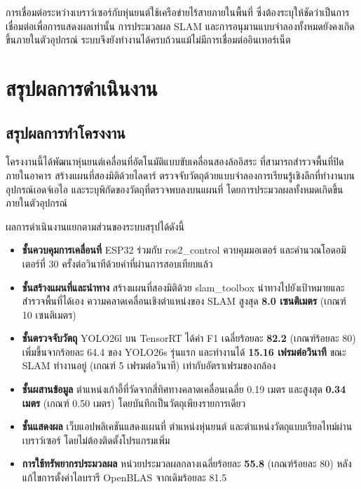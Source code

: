 \documentclass[a4paper,12pt]{report}
\begin{document}
การเชื่อมต่อระหว่างเบราว์เซอร์กับหุ่นยนต์ใช้เครือข่ายไร้สายภายในพื้นที่
ซึ่งต้องระบุให้ชัดว่าเป็นการเชื่อมต่อเพื่อการแสดงผลเท่านั้น
การประมวลผล SLAM และการอนุมานแบบจำลองทั้งหมดยังคงเกิดขึ้นภายในตัวอุปกรณ์
ระบบจึงยังทำงานได้ครบถ้วนแม้ไม่มีการเชื่อมต่ออินเทอร์เน็ต

\chapter{สรุปผลการดำเนินงาน}

\section{สรุปผลการทำโครงงาน}

โครงงานนี้ได้พัฒนาหุ่นยนต์เคลื่อนที่อัตโนมัติแบบขับเคลื่อนสองล้ออิสระ
ที่สามารถสำรวจพื้นที่ปิดภายในอาคาร สร้างแผนที่สองมิติด้วยไลดาร์
ตรวจจับวัตถุด้วยแบบจำลองการเรียนรู้เชิงลึกที่ทำงานบนอุปกรณ์เอดจ์เอไอ
และระบุพิกัดของวัตถุที่ตรวจพบลงบนแผนที่
โดยการประมวลผลทั้งหมดเกิดขึ้นภายในตัวอุปกรณ์

ผลการดำเนินงานแยกตามส่วนของระบบสรุปได้ดังนี้

\begin{itemize}[leftmargin=1.25cm, itemsep=4pt, topsep=6pt]
    \item \textbf{ชั้นควบคุมการเคลื่อนที่} ESP32 ร่วมกับ ros2\_control ควบคุมมอเตอร์
    และคำนวณโอดอมิเตอร์ที่ 30 ครั้งต่อวินาทีด้วยค่าที่ผ่านการสอบเทียบแล้ว

    \item \textbf{ชั้นสร้างแผนที่และนำทาง} สร้างแผนที่สองมิติด้วย slam\_toolbox
    นำทางไปยังเป้าหมายและสำรวจพื้นที่ได้เอง
    ความคลาดเคลื่อนเชิงตำแหน่งของ SLAM สูงสุด \textbf{8.0 เซนติเมตร} (เกณฑ์ 10 เซนติเมตร)

    \item \textbf{ชั้นตรวจจับวัตถุ} YOLO26l บน TensorRT ได้ค่า F1 เฉลี่ยร้อยละ \textbf{82.2} (เกณฑ์ร้อยละ 80)
    เพิ่มขึ้นจากร้อยละ 64.4 ของ YOLO26s รุ่นแรก
    และทำงานได้ \textbf{15.16 เฟรมต่อวินาที} ขณะ SLAM ทำงานอยู่ (เกณฑ์ 5 เฟรมต่อวินาที)
    เท่ากับอัตราเฟรมของกล้อง

    \item \textbf{ชั้นผสานข้อมูล} ตำแหน่งเก้าอี้ที่วัดจากสี่ทิศทางคลาดเคลื่อนเฉลี่ย 0.19 เมตร
    และสูงสุด \textbf{0.34 เมตร} (เกณฑ์ 0.50 เมตร) โดยบันทึกเป็นวัตถุเพียงรายการเดียว

    \item \textbf{ชั้นแสดงผล} เว็บแอปพลิเคชันแสดงแผนที่ ตำแหน่งหุ่นยนต์
    และตำแหน่งวัตถุแบบเรียลไทม์ผ่านเบราว์เซอร์ โดยไม่ต้องติดตั้งโปรแกรมเพิ่ม

    \item \textbf{การใช้ทรัพยากรประมวลผล} หน่วยประมวลผลกลางเฉลี่ยร้อยละ \textbf{55.8} (เกณฑ์ร้อยละ 80)
    หลังแก้ไขการตั้งค่าไลบรารี OpenBLAS จากเดิมร้อยละ 81.5
\end{itemize}
\end{document}
